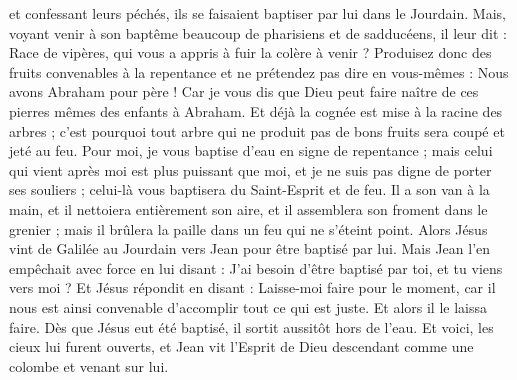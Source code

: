 \begin{multicols}{2}
et confessant leurs péchés, ils se faisaient baptiser par lui dans le Jourdain.
Mais, voyant venir à son baptême beaucoup de pharisiens et de sadducéens, il leur dit : Race de vipères, qui vous a appris à fuir la colère à venir ?
Produisez donc des fruits convenables à la repentance
et ne prétendez pas dire en vous-mêmes : Nous avons Abraham pour père ! Car je vous dis que Dieu peut faire naître de ces pierres mêmes des enfants à Abraham.
Et déjà la cognée est mise à la racine des arbres ; c'est pourquoi tout arbre qui ne produit pas de bons fruits sera coupé et jeté au feu.
Pour moi, je vous baptise d'eau en signe de repentance ; mais celui qui vient après moi est plus puissant que moi, et je ne suis pas digne de porter ses souliers ; celui-là vous baptisera du Saint-Esprit et de feu.
Il a son van à la main, et il nettoiera entièrement son aire, et il assemblera son froment dans le grenier ; mais il brûlera la paille dans un feu qui ne s'éteint point.
Alors Jésus vint de Galilée au Jourdain vers Jean pour être baptisé par lui.
Mais Jean l'en empêchait avec force en lui disant : J'ai besoin d'être baptisé par toi, et tu viens vers moi ?
Et Jésus répondit en disant : Laisse-moi faire pour le moment, car il nous est ainsi convenable d'accomplir tout ce qui est juste. Et alors il le laissa faire.
Dès que Jésus eut été baptisé, il sortit aussitôt hors de l'eau. Et voici, les cieux lui furent ouverts, et Jean vit l'Esprit de Dieu descendant comme une colombe et venant sur lui.

\end{multicols}
